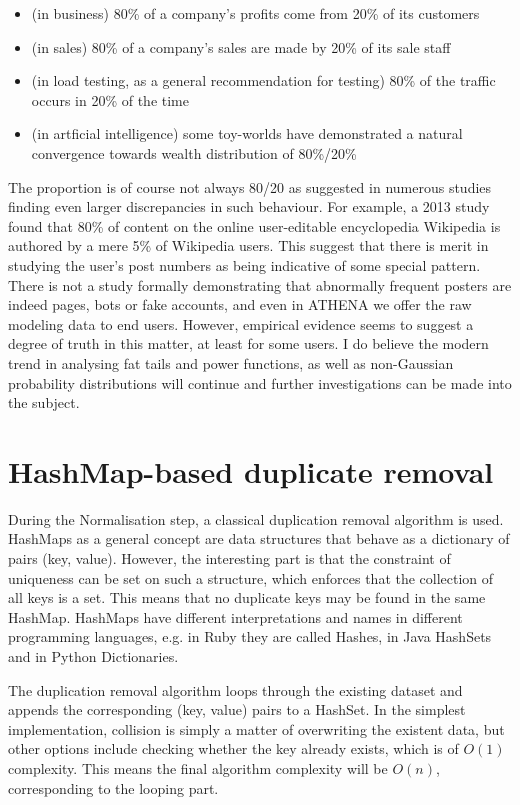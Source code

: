\documentclass[12pt,a4paper,twoside]{report}
\begin{document}
\begin{itemize}
\item (in business) 80\% of a company's profits come from 20\% of its customers
\item (in sales) 80\% of a company's sales are made by 20\% of its sale staff
\item (in load testing, as a general recommendation for testing) 80\% of the traffic occurs in 20\% of the time
\item (in artficial intelligence) some toy-worlds have demonstrated a natural convergence towards wealth distribution of 80\%/20\%
\end{itemize}

The proportion is of course not always 80/20 as suggested in numerous studies finding even larger discrepancies in such behaviour. For example, a 2013 study \cite{muchnik2013origins} found that 80\% of content on the online user-editable encyclopedia Wikipedia is authored by a mere 5\% of Wikipedia users. This suggest that there is merit in studying the user's post numbers as being indicative of some special pattern. There is not a study formally demonstrating that abnormally frequent posters are indeed pages, bots or fake accounts, and even in ATHENA we offer the raw modeling data to end users. However, empirical evidence seems to suggest a degree of truth in this matter, at least for some users. I do believe the modern trend in analysing fat tails and power functions, as well as non-Gaussian probability distributions will continue and further investigations can be made into the subject.

\section{HashMap-based duplicate removal}
During the Normalisation step, a classical duplication removal algorithm is used. HashMaps as a general concept are data structures that behave as a dictionary of pairs (key, value). However, the interesting part is that the constraint of uniqueness can be set on such a structure, which enforces that the collection of all keys is a set. This means that no duplicate keys may be found in the same HashMap. HashMaps have different interpretations and names in different programming languages, e.g. in Ruby they are called Hashes, in Java HashSets and in Python Dictionaries.

The duplication removal algorithm loops through the existing dataset and appends the corresponding (key, value) pairs to a HashSet. In the simplest implementation, collision is simply a matter of overwriting the existent data, but other options include checking whether the key already exists, which is of $O(1)$ complexity. This means the final algorithm complexity will be $O(n)$, corresponding to the looping part.
\end{document}
